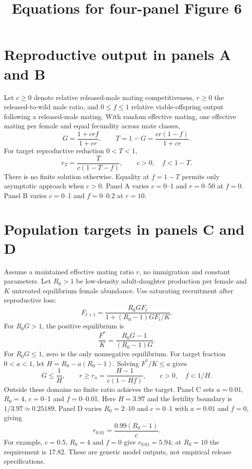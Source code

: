 \documentclass[11pt]{article}
\title{Equations for four-panel Figure 6}
\author{}
\date{}
\begin{document}
\maketitle
\section*{Reproductive output in panels A and B}
Let $c\geq0$ denote relative released-male mating competitiveness, $r\geq0$ the released-to-wild male ratio, and $0\leq f\leq1$ relative viable-offspring output following a released-male mating. With random effective mating, one effective mating per female and equal fecundity across mate classes,
\begin{equation}
G=\frac{1+crf}{1+cr},\qquad T=1-G=\frac{cr(1-f)}{1+cr}.
\end{equation}
For target reproductive reduction $0<T<1$,
\begin{equation}
r_T=\frac{T}{c(1-T-f)},\qquad c>0,\quad f<1-T.
\end{equation}
There is no finite solution otherwise. Equality at $f=1-T$ permits only asymptotic approach when $c>0$. Panel A varies $c=0$--1 and $r=0$--50 at $f=0$. Panel B varies $c=0$--1 and $f=0$--0.2 at $r=10$.

\section*{Population targets in panels C and D}
Assume a maintained effective mating ratio $r$, no immigration and constant parameters. Let $R_0>1$ be low-density adult-daughter production per female and $K$ untreated equilibrium female abundance. Use saturating recruitment after reproductive loss:
\begin{equation}
F_{t+1}=\frac{R_0GF_t}{1+(R_0-1)GF_t/K}.
\end{equation}
For $R_0G>1$, the positive equilibrium is
\begin{equation}
\frac{F^*}{K}=\frac{R_0G-1}{(R_0-1)G}.
\end{equation}
For $R_0G\leq1$, zero is the only nonnegative equilibrium. For target fraction $0<a<1$, let $H=R_0-a(R_0-1)$. Solving $F^*/K\leq a$ gives
\begin{equation}
G\leq\frac{1}{H},\qquad
r\geq r_a=\frac{H-1}{c(1-Hf)},\qquad c>0,\quad f<1/H.
\end{equation}
Outside these domains no finite ratio achieves the target. Panel C sets $a=0.01$, $R_0=4$, $c=0$--1 and $f=0$--0.01. Here $H=3.97$ and the fertility boundary is $1/3.97\simeq0.25189$. Panel D varies $R_0=2$--10 and $c=0$--1 with $a=0.01$ and $f=0$, giving
\begin{equation}
r_{0.01}=\frac{0.99(R_0-1)}{c}.
\end{equation}
For example, $c=0.5$, $R_0=4$ and $f=0$ give $r_{0.01}=5.94$; at $R_0=10$ the requirement is 17.82. These are generic model outputs, not empirical release specifications.
\end{document}
